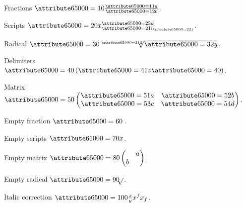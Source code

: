 \documentclass{article}
\begin{document}
Fractions $\begingroup\attribute65000=10 \frac{\attribute65000=11 a}{\attribute65000=12 b}\endgroup$.

Scripts $\begingroup\attribute65000=20 x_{\attribute65000=21 i_{\attribute65000=22 j}}^{\attribute65000=23 k}\endgroup$.

Radical $\begingroup\attribute65000=30 \sqrt[\attribute65000=31 3]{\attribute65000=32 y}\endgroup$.

Delimiters $\begingroup\attribute65000=40 \left(\attribute65000=41 z\attribute65000=40 \right)\endgroup$.

Matrix $\begingroup\attribute65000=50 \begin{pmatrix}\attribute65000=51 a & \attribute65000=52 b \\ \attribute65000=53 c & \attribute65000=54 d\end{pmatrix}\endgroup$.

Empty fraction $\begingroup\attribute65000=60 \frac{}{}\endgroup$.

Empty scripts $\begingroup\attribute65000=70 x_{}^{}\endgroup$.

Empty matrix $\begingroup\attribute65000=80 \begin{pmatrix} & a \\ b & \end{pmatrix}\endgroup$.

Empty radical $\begingroup\attribute65000=90 \sqrt[]{}\endgroup$.

Italic correction $\begingroup\attribute65000=100 \frac{x}{y} x^{f} x_{f}\endgroup$.
\end{document}
